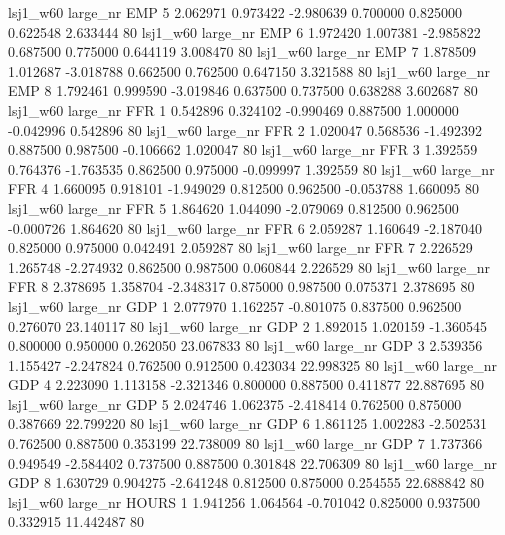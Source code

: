     lsj1_w60   large_nr      EMP                 5  2.062971  0.973422  -2.980639 0.700000 0.825000  0.622548    2.633444 80
    lsj1_w60   large_nr      EMP                 6  1.972420  1.007381  -2.985822 0.687500 0.775000  0.644119    3.008470 80
    lsj1_w60   large_nr      EMP                 7  1.878509  1.012687  -3.018788 0.662500 0.762500  0.647150    3.321588 80
    lsj1_w60   large_nr      EMP                 8  1.792461  0.999590  -3.019846 0.637500 0.737500  0.638288    3.602687 80
    lsj1_w60   large_nr      FFR                 1  0.542896  0.324102  -0.990469 0.887500 1.000000 -0.042996    0.542896 80
    lsj1_w60   large_nr      FFR                 2  1.020047  0.568536  -1.492392 0.887500 0.987500 -0.106662    1.020047 80
    lsj1_w60   large_nr      FFR                 3  1.392559  0.764376  -1.763535 0.862500 0.975000 -0.099997    1.392559 80
    lsj1_w60   large_nr      FFR                 4  1.660095  0.918101  -1.949029 0.812500 0.962500 -0.053788    1.660095 80
    lsj1_w60   large_nr      FFR                 5  1.864620  1.044090  -2.079069 0.812500 0.962500 -0.000726    1.864620 80
    lsj1_w60   large_nr      FFR                 6  2.059287  1.160649  -2.187040 0.825000 0.975000  0.042491    2.059287 80
    lsj1_w60   large_nr      FFR                 7  2.226529  1.265748  -2.274932 0.862500 0.987500  0.060844    2.226529 80
    lsj1_w60   large_nr      FFR                 8  2.378695  1.358704  -2.348317 0.875000 0.987500  0.075371    2.378695 80
    lsj1_w60   large_nr      GDP                 1  2.077970  1.162257  -0.801075 0.837500 0.962500  0.276070   23.140117 80
    lsj1_w60   large_nr      GDP                 2  1.892015  1.020159  -1.360545 0.800000 0.950000  0.262050   23.067833 80
    lsj1_w60   large_nr      GDP                 3  2.539356  1.155427  -2.247824 0.762500 0.912500  0.423034   22.998325 80
    lsj1_w60   large_nr      GDP                 4  2.223090  1.113158  -2.321346 0.800000 0.887500  0.411877   22.887695 80
    lsj1_w60   large_nr      GDP                 5  2.024746  1.062375  -2.418414 0.762500 0.875000  0.387669   22.799220 80
    lsj1_w60   large_nr      GDP                 6  1.861125  1.002283  -2.502531 0.762500 0.887500  0.353199   22.738009 80
    lsj1_w60   large_nr      GDP                 7  1.737366  0.949549  -2.584402 0.737500 0.887500  0.301848   22.706309 80
    lsj1_w60   large_nr      GDP                 8  1.630729  0.904275  -2.641248 0.812500 0.875000  0.254555   22.688842 80
    lsj1_w60   large_nr    HOURS                 1  1.941256  1.064564  -0.701042 0.825000 0.937500  0.332915   11.442487 80
